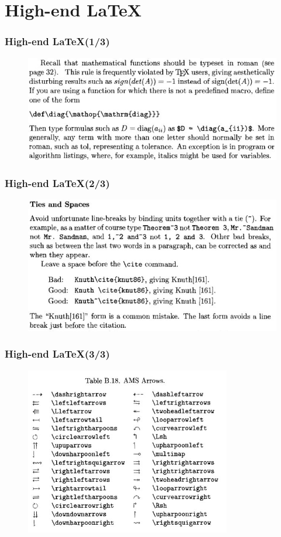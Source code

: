 \documentclass{beamer}
\begin{document}
\section{High-end \LaTeX}
\begin{frame}
\frametitle{High-end \LaTeX (1/3)}
\begin{figure}[t]
 \includegraphics[width=\textwidth]{images/diag.jpeg}
\end{figure}
\end{frame}
\begin{frame}
\frametitle{High-end \LaTeX (2/3)}
\begin{figure}[t]
 \includegraphics[width=\textwidth]{images/tilde.jpeg}
\end{figure}
\end{frame}
\begin{frame}
\frametitle{High-end \LaTeX (3/3)}
\begin{figure}[t]
 \includegraphics[width=0.8\textwidth]{images/detexify.jpeg}
\end{figure}
\end{frame}
\end{document}
